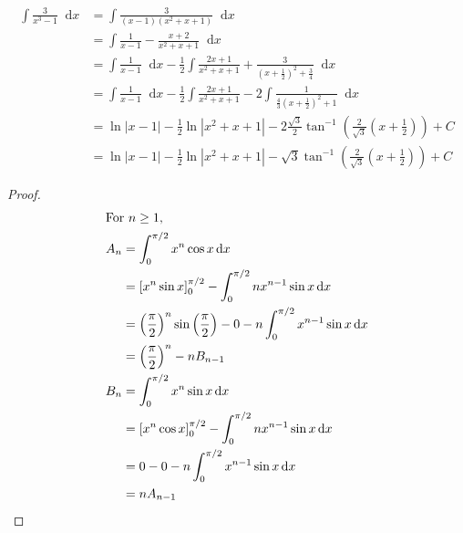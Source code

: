 \documentclass[12pt]{article}
\newcommand*\diff{\mathop{}\!\mathrm{d}}
\newenvironment{problem}[2][Problem]{\begin{trivlist}
\item[\hskip \labelsep {\bfseries #1}\hskip \labelsep {\bfseries #2.}]}{\end{trivlist}}
\begin{document}
\begin{problem}{2.c}
\end{problem}
\begin{align*}
\int 
	\frac{
		3
	}
	{
		x^3 - 1
	}
\diff x
&=
\int 
	\frac{
		3
	}
	{
		(x-1) (x^2+x+1)
	}
\diff x
\\
&=
\int 
	\frac{
		1
	}
	{
		x-1
	}
	-
	\frac{
		x+2
	}
	{
		x^2+x+1
	}
\diff x
\\
&=
\int 
	\frac{
		1
	}
	{
		x-1
	}
\diff x
-
\frac{1}{2}\int 
	\frac{
		2x+1
	}
	{
		x^2+x+1
	}
	+
	\frac{
		3
	}
	{
		(x+\frac{1}{2})^2 + \frac{3}{4}
	}
\diff x
\\
&=
\int 
	\frac{
		1
	}
	{
		x-1
	}
\diff x
-
\frac{1}{2}\int 
	\frac{
		2x+1
	}
	{
		x^2+x+1
	}
-
2\int 
	\frac{
		1
	}
	{
		\frac{4}{3} (x+\frac{1}{2})^2 + 1
	}
\diff x
\\
&=
\ln|x-1|
-
\frac{1}{2}\ln |x^2+x+1|
-
2 
\frac{\sqrt{3}}{2}
\tan^{-1} \left(
	\frac{2}{\sqrt{3}} (x+\frac{1}{2})
\right)
+ C
\\
&=
\ln|x-1|
-
\frac{1}{2}\ln |x^2+x+1|
-
\sqrt{3}
\tan^{-1} \left(
	\frac{2}{\sqrt{3}} (x+\frac{1}{2})
\right)
+ C
\end{align*}
\filbreak

\begin{problem}{3.i}
\end{problem}
\begin{proof}
\begin{align*}
\intertext{For $n \ge 1$,}
A_n 
&= 
\int_{0}^{\pi/2} 
	x^n \cos x
\diff x
\\
&=
\left[
	x^n \sin x
\right]_{0}^{\pi/2}
-
\int_{0}^{\pi/2} 
	n x^{n-1} \sin x
\diff x
\\
&=
\left(\frac{\pi}{2}\right)^n \sin \left(\frac{\pi}{2}\right)
- 0 -
n\int_{0}^{\pi/2} 
	x^{n-1} \sin x
\diff x
\\
&=
\left(\frac{\pi}{2}\right)^n 
- 
n B_{n-1}
\\
B_n 
&= 
\int_{0}^{\pi/2} 
	x^n \sin x
\diff x
\\
&=
\left[
	x^n \cos x
\right]_{0}^{\pi/2}
-
\int_{0}^{\pi/2} 
	n x^{n-1} \sin x
\diff x
\\
&=
0 - 0 -
n\int_{0}^{\pi/2} 
	x^{n-1} \sin x
\diff x
\\
&=
n A_{n-1}
\\
\end{align*}
\end{proof}
\filbreak
\end{document}
